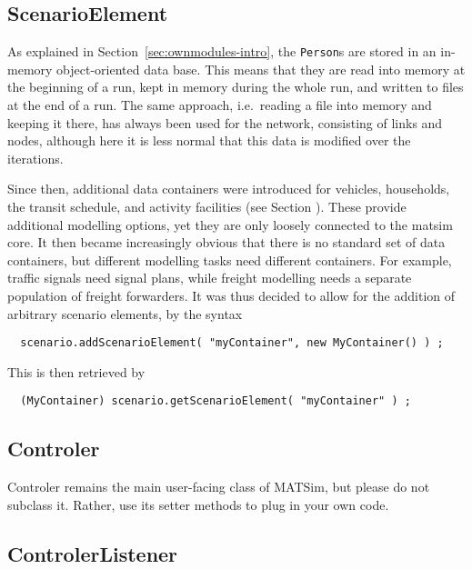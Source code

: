 \subsection{ScenarioElement}

As explained in Section~\ref{sec:ownmodules-intro}, the \lstinline$Person$s are stored in an in-memory object-oriented data base.  This means that they are read into memory at the beginning of a run, kept in memory during the whole run, and written to files at the end of a run.
%
The same approach, i.e.\ reading a file into memory and keeping it there, has always been used for the network, consisting of links and nodes, although here it is less normal that this data is modified over the iterations.

Since then, additional data containers were introduced for vehicles, households, the transit schedule, and activity facilities (see Section ).  These provide additional modelling options, yet they are only loosely connected to the \acrshort{matsim} core.  It then became increasingly obvious that there is no standard set of data containers, but different modelling tasks need different containers.  For example, traffic signals need signal plans, while freight modelling needs a separate population of freight forwarders.  It was thus decided to allow for the addition of arbitrary scenario elements, by the syntax
\begin{lstlisting}
  scenario.addScenarioElement( "myContainer", new MyContainer() ) ;
\end{lstlisting}
This is then retrieved by
\begin{lstlisting}
  (MyContainer) scenario.getScenarioElement( "myContainer" ) ;
\end{lstlisting}

\subsection{Controler}
\label{sec:controlerextension}
Controler remains the main user-facing class of MATSim, but please do not subclass it. Rather,
use its setter methods to plug in your own code.

\subsection{ControlerListener}

